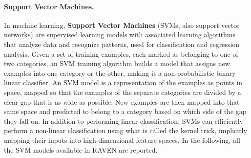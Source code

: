 \paragraph{Support Vector Machines.}
\label{SVM}
In machine learning, \textbf{Support Vector Machines} (SVMs, also support vector
networks) are supervised learning models with associated learning algorithms
that analyze data and recognize patterns, used for classification and regression
analysis.
%
Given a set of training examples, each marked as belonging to one of two
categories, an SVM training algorithm builds a model that assigns new examples
into one category or the other, making it a non-probabilistic binary linear
classifier.
%
An SVM model is a representation of the examples as points in space, mapped so
that the examples of the separate categories are divided by a clear gap that is
as wide as possible.
%
New examples are then mapped into that same space and predicted to belong to a
category based on which side of the gap they fall on.
%
In addition to performing linear classification, SVMs can efficiently perform a
non-linear classification using what is called the kernel trick, implicitly
mapping their inputs into high-dimensional feature spaces.
%
In the following, all the SVM models available in RAVEN are reported.

